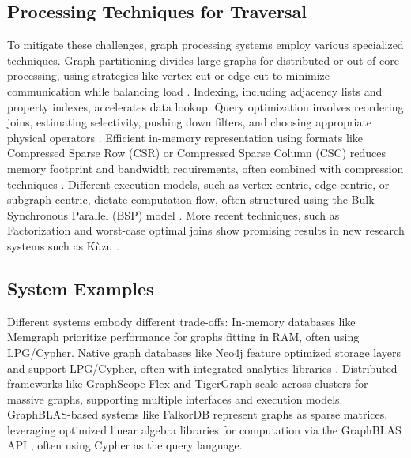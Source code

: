 \documentclass[sigconf,natbib=false]{acmart}
\begin{document}
\subsection{Processing Techniques for Traversal}
To mitigate these challenges, graph processing systems employ various specialized techniques.
Graph partitioning divides large graphs for distributed or out-of-core processing, using strategies like vertex-cut or edge-cut to minimize communication while balancing load \cite{liu2020LargescaleGraphProcessing}.
Indexing, including adjacency lists and property indexes, accelerates data lookup.
Query optimization involves reordering joins, estimating selectivity, pushing down filters, and choosing appropriate physical operators \cite{ali2021SurveyRDFStores}. %
Efficient in-memory representation using formats like Compressed Sparse Row (CSR) or Compressed Sparse Column (CSC) reduces memory footprint and bandwidth requirements, often combined with compression techniques \cite{feng2023KUZUGraphDatabase,liu2020LargescaleGraphProcessing}. %
Different execution models, such as vertex-centric, edge-centric, or subgraph-centric, dictate computation flow, often structured using the Bulk Synchronous Parallel (BSP) model \cite{liu2020LargescaleGraphProcessing}.
More recent techniques, such as Factorization \cite{olteanuFactorizedDatabases2016} and worst-case optimal joins \cite{mhedhbiOptimizingOnetimeContinuous}\cite{mhedhbiOptimizingSubgraphQueries2019} show promising results in new research systems such as K{\`u}zu \cite{feng2023KUZUGraphDatabase}.

\subsection{System Examples}
Different systems embody different trade-offs: In-memory databases like Memgraph \cite{Memgraph} prioritize performance for graphs fitting in RAM, often using LPG/Cypher.
Native graph databases like Neo4j \cite{2025Neo4jGraphDatabase} feature optimized storage layers and support LPG/Cypher, often with integrated analytics libraries \cite{IntroductionCypherManual}.
Distributed frameworks like GraphScope Flex \cite{he2023GraphScopeFlexLEGOlike} and TigerGraph \cite{deutsch2019TigerGraphNativeMPP} scale across clusters for massive graphs, supporting multiple interfaces and execution models.
GraphBLAS-based systems like FalkorDB \cite{2025FalkorDBGraphDatabase} represent graphs as sparse matrices, leveraging optimized linear algebra libraries for computation via the GraphBLAS API \cite{GraphBLAS,buluc2017DesignGraphBLASAPI}, often using Cypher as the query language.
\end{document}
